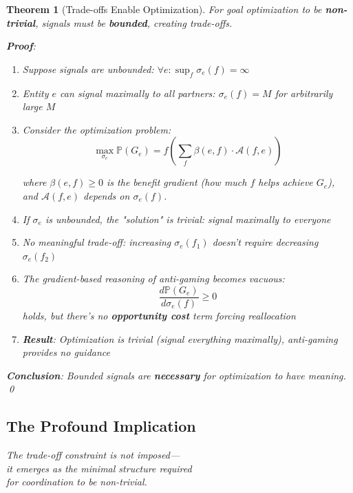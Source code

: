 \documentclass[11pt,a4paper]{article}
\newtheorem{theorem}{Theorem}[section]
\theoremstyle{definition}
\theoremstyle{remark}
\newcommand{\A}{\mathcal{A}}
\begin{document}
\begin{theorem}[Trade-offs Enable Optimization]
\label{thm:tradeoffs-necessary}
For goal optimization to be \textbf{non-trivial}, signals must be \textbf{bounded}, creating trade-offs.

\textbf{Proof}:
\begin{enumerate}
\item Suppose signals are unbounded: $\forall e: \sup_f \sigma_e(f) = \infty$

\item Entity $e$ can signal maximally to all partners: $\sigma_e(f) = M$ for arbitrarily large $M$

\item Consider the optimization problem:
\[ \max_{\sigma_e} \mathbb{P}(G_e) = f\left(\sum_f \beta(e,f) \cdot \A(f,e)\right) \]

where $\beta(e,f) \ge 0$ is the benefit gradient (how much $f$ helps achieve $G_e$), and $\A(f,e)$ depends on $\sigma_e(f)$.

\item If $\sigma_e$ is unbounded, the "solution" is trivial: signal maximally to everyone

\item No meaningful trade-off: increasing $\sigma_e(f_1)$ doesn't require decreasing $\sigma_e(f_2)$

\item The gradient-based reasoning of anti-gaming becomes vacuous:
\[ \frac{d\mathbb{P}(G_e)}{d\sigma_e(f)} \ge 0 \]
holds, but there's no \textbf{opportunity cost} term forcing reallocation

\item \textbf{Result}: Optimization is trivial (signal everything maximally), anti-gaming provides no guidance
\end{enumerate}

\textbf{Conclusion}: Bounded signals are \textbf{necessary} for optimization to have meaning. \qed
\end{theorem}

\subsection{The Profound Implication}

\begin{center}
\large
\textit{The trade-off constraint is not imposed—}\\
\textit{it emerges as the minimal structure required}\\
\textit{for coordination to be non-trivial.}
\end{center}
\end{document}
